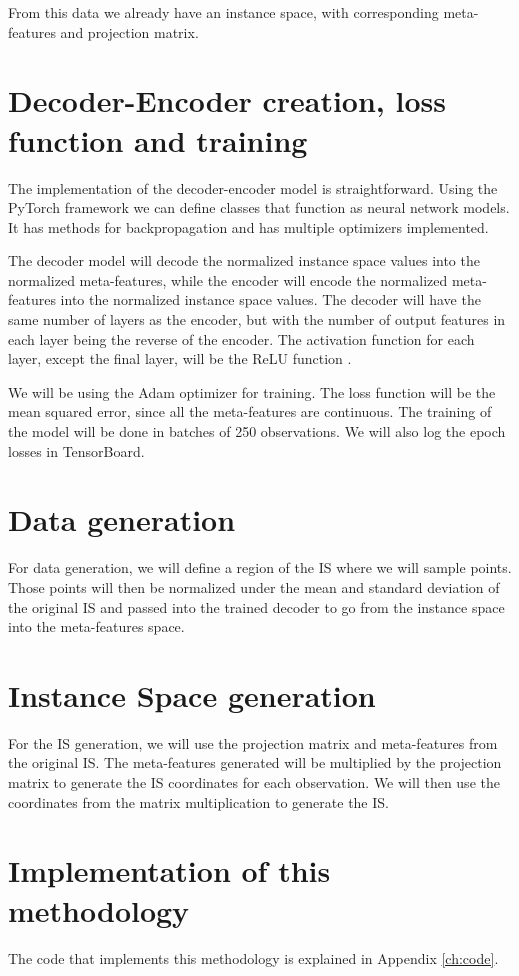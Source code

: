From this data we already have an instance space, with corresponding meta-features and projection matrix.

\section{Decoder-Encoder creation, loss function and training}

The implementation of the decoder-encoder model is straightforward. Using the PyTorch \cite{paszke2019pytorch} framework we can define classes that function as neural network models. It has methods for backpropagation and has multiple optimizers implemented. 

The decoder model will decode the normalized instance space values into the normalized meta-features, while the encoder will encode the normalized meta-features into the normalized instance space values. The decoder will have the same number of layers as the encoder, but with the number of output features in each layer being the reverse of the encoder. The activation function for each layer, except the final layer, will be the ReLU function \cite{agarap2019deep}.

We will be using the Adam optimizer \cite{kingma2017adam} for training. The loss function will be the mean squared error, since all the meta-features are continuous. The training of the model will be done in batches of 250 observations. We will also log the epoch losses in TensorBoard.

\section{Data generation}

For data generation, we will define a region of the IS where we will sample points. Those points will then be normalized under the mean and standard deviation of the original IS and passed into the trained decoder to go from the instance space into the meta-features space.

\section{Instance Space generation}

For the IS generation, we will use the projection matrix and meta-features from the original IS. The meta-features generated will be multiplied by the projection matrix to generate the IS coordinates for each observation. We will then use the coordinates from the matrix multiplication to generate the IS.

\section{Implementation of this methodology}

The code that implements this methodology is explained in Appendix \ref{ch:code}.